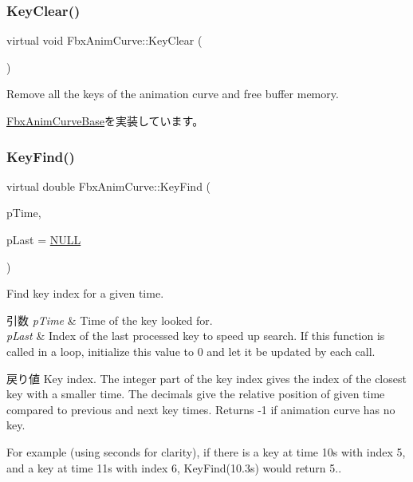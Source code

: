 \subsubsection{\texorpdfstring{Key\+Clear()}{KeyClear()}}
{\footnotesize\ttfamily virtual void Fbx\+Anim\+Curve\+::\+Key\+Clear (\begin{DoxyParamCaption}{ }\end{DoxyParamCaption})\hspace{0.3cm}{\ttfamily [pure virtual]}}



Remove all the keys of the animation curve and free buffer memory. 



\hyperlink{class_fbx_anim_curve_base_abe693d293087fad223770430ec79d65d}{Fbx\+Anim\+Curve\+Base}を実装しています。

\mbox{\label{class_fbx_anim_curve_a19b276335ead40663ccf4c16d6ff5e27}} 
\subsubsection{\texorpdfstring{Key\+Find()}{KeyFind()}}
{\footnotesize\ttfamily virtual double Fbx\+Anim\+Curve\+::\+Key\+Find (\begin{DoxyParamCaption}\item[{\hyperlink{class_fbx_time}{Fbx\+Time}}]{p\+Time,  }\item[{int $\ast$}]{p\+Last = {\ttfamily \hyperlink{fbxarch_8h_a070d2ce7b6bb7e5c05602aa8c308d0c4}{N\+U\+LL}} }\end{DoxyParamCaption})\hspace{0.3cm}{\ttfamily [pure virtual]}}

Find key index for a given time. 
\begin{DoxyParams}{引数}
{\em p\+Time} & Time of the key looked for. \\
\hline
{\em p\+Last} & Index of the last processed key to speed up search. If this function is called in a loop, initialize this value to 0 and let it be updated by each call. \\
\hline
\end{DoxyParams}
\begin{DoxyReturn}{戻り値}
Key index. The integer part of the key index gives the index of the closest key with a smaller time. The decimals give the relative position of given time compared to previous and next key times. Returns -\/1 if animation curve has no key.
\end{DoxyReturn}
For example (using seconds for clarity), if there is a key at time 10s with index 5, and a key at time 11s with index 6, Key\+Find(10.\+3s) would return 5.. \mbox{\label{class_fbx_anim_curve_aec10e4a71979bd990d98cd002f29e82c}} 
